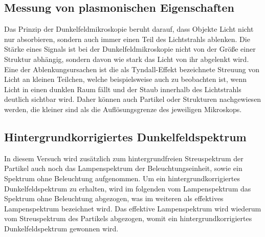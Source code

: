 \subsection{Messung von plasmonischen Eigenschaften}
\label{sub:messungEigenschaften}

Das Prinzip der Dunkelfeldmikroskopie beruht darauf, dass Objekte Licht nicht nur absorbieren, sondern auch immer einen Teil des Lichtstrahls ablenken. Die Stärke eines Signals ist bei der Dunkelfeldmikroskopie nicht von der Größe einer Struktur abhängig, sondern davon wie stark das Licht von ihr abgelenkt wird. Eine der Ablenkungsursachen ist die als Tyndall-Effekt bezeichnete Streuung von Licht an kleinen Teilchen, welche beispielsweise auch zu beobachten ist, wenn Licht in einen dunklen Raum fällt und der Staub innerhalb des Lichtstrahls deutlich sichtbar wird. Daher können auch Partikel oder Strukturen nachgewiesen werden, die kleiner sind als die Auflösungsgrenze des jeweiligen Mikroskops. \cite{WikiDunkelfeld}

\subsection{Hintergrundkorrigiertes Dunkelfeldspektrum}
\label{sub:korrigiertesSignal}

In diesem Versuch wird zusätzlich zum hintergrundfreien Streuspektrum der Partikel auch noch das Lampenspektrum der Beleuchtungseinheit, sowie ein Spektrum ohne Beleuchtung aufgenommen. Um ein hintergrundkorrigiertes Dunkelfeldspektrum zu erhalten, wird im folgenden vom Lampenspektrum das Spektrum ohne Beleuchtung abgezogen, was im weiteren als effektives Lampenspektrum bezeichnet wird. Das effektive Lampenspektrum wird wiederum vom Streuspektrum des Partikels abgezogen, womit ein hintergrundkorrigiertes Dunkelfeldspektrum gewonnen wird.